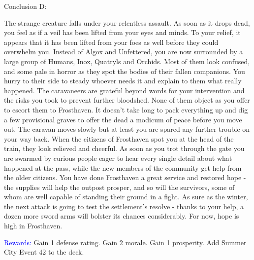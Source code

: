 \documentclass[fontsize=11pt]{scrartcl}
\begin{document}
\begin{multicols*}{3}
\begin{center}
		  {\myfont\large{\textcolor{OliveGreen}{Conclusion D:}}}
		\end{center}
		\footnotesize{The strange creature falls under your relentless assault. As soon as it drops dead, you feel as if a veil has been lifted from your eyes and minds. To your relief, it appears that it has been lifted from your foes as well before they could overwhelm you. Instead of Algox and Unfettered, you are now surrounded by a large group of Humans, Inox, Quatryls and Orchids. Most of them look confused, and some pale in horror as they spot the bodies of their fallen companions. You hurry to their side to steady whoever needs it and explain to them what really happened. The caravaneers are grateful beyond words for your intervention and the risks you took to prevent further bloodshed. None of them object as you offer to escort them to Frosthaven. It doesn’t take long to pack everything up and dig a few provisional graves to offer the dead a modicum of peace before you move out.\newline\newline
The caravan moves slowly but at least you are spared any further trouble on your way back. When the citizens of Frosthaven spot you at the head of the train, they look relieved and cheerful. As soon as you trot through the gate you are swarmed by curious people eager to hear every single detail about what happened at the pass, while the new members of the community get help from the older citizens. You have done Frosthaven a great service and restored hope - the supplies will help the outpost prosper, and so will the survivors, some of whom are well capable of standing their ground in a fight. As sure as the winter, the next attack is going to test the settlement’s resolve - thanks to your help, a dozen more sword arms will bolster its chances considerably. For now, hope is high in Frosthaven.}
		\begin{center}
		  {\myfont\normalsize{\textcolor{Blue}{Rewards:}}}\newline
		  \footnotesize{Gain 1 defense rating.\newline
Gain 2 morale.\newline
Gain 1 prosperity.\newline
Add Summer City Event 42 to the deck.}
		\end{center}
	\end{multicols*}
\end{document}
